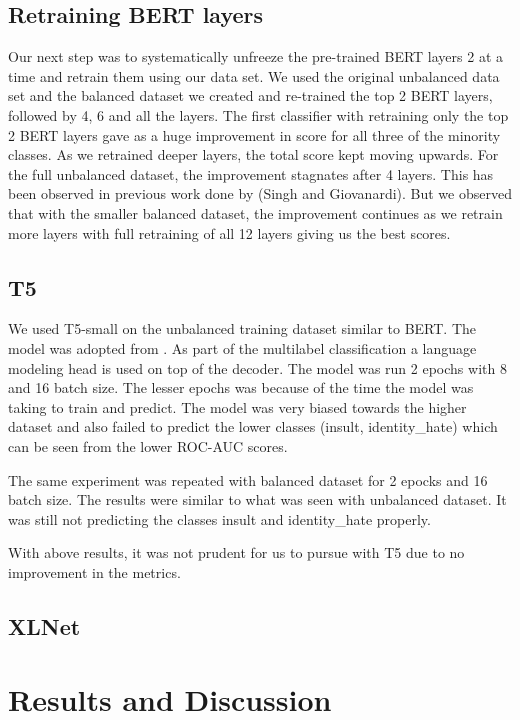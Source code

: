 \documentclass[11pt,a4paper]{article}
\begin{document}
\subsection{Retraining BERT layers}
Our next step was to systematically unfreeze the pre-trained BERT layers 2 at a time and retrain them using our data set. We used the original unbalanced data set and the balanced dataset we created and re-trained the top 2 BERT layers, followed by 4, 6 and all the layers.
The first classifier with retraining only the top 2 BERT layers gave as a huge improvement in score for all three of the minority classes. As we retrained deeper layers, the total score kept moving upwards. For the full unbalanced dataset, the improvement stagnates after 4 layers. This has been observed in previous work done by (Singh and Giovanardi). But we observed that with the smaller balanced dataset, the improvement continues as we retrain more layers with full retraining of all 12 layers giving us the best scores.


\subsection{T5}
We used T5-small \cite{raffel2020exploring} on the unbalanced training dataset similar to BERT. The model was adopted from \cite{t5mlcode}. As part of the multilabel classification a language modeling head is used on top of the decoder. The model was run 2 epochs with 8 and 16 batch size. The lesser epochs was because of the time the model was taking to train and predict. The model was very biased towards the higher dataset and also failed to predict the lower classes (insult, identity\_hate) which can be seen from the lower ROC-AUC scores.

The same experiment was repeated with balanced dataset for 2 epocks and 16 batch size. The results were similar to what was seen with unbalanced dataset. It was still not predicting the classes insult and identity\_hate properly.

With above results, it was not prudent for us to pursue with T5 due to no improvement in the metrics.

\subsection{XLNet}

\section{Results and Discussion}
\end{document}
